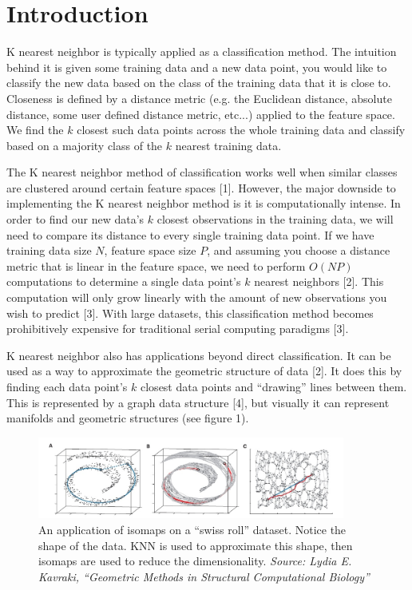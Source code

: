 \section{Introduction}

\vspace{5 mm}
\noindent
K nearest neighbor is typically applied as a classification method. The 
intuition behind it is given some training data and a new data point, you would 
like to classify the new data based on the class of the training data that it 
is close to. Closeness is defined by a distance metric (e.g. the Euclidean 
distance, absolute distance, some user defined distance metric, etc...) applied 
to the feature space. We find the $k$ closest such data points across the whole 
training data and classify based on a majority class of the $k$ nearest 
training data.

\vspace{5 mm}
\noindent
The K nearest neighbor method of classification works well when similar classes 
are clustered around certain feature spaces [1]. However, the major downside to 
implementing the K nearest neighbor method is it is computationally intense. 
In order to find our new data's $k$ closest observations in the training data, 
we will need to compare its distance to every single training data point. 
If we have training data size $N$, feature space size $P$, and assuming you 
choose a distance metric that is linear in the feature space, we need to 
perform $O(NP)$ computations to determine a single data point's $k$ nearest 
neighbors [2]. This computation will only grow linearly with the amount of new 
observations you wish to predict [3]. With large datasets, this classification 
method becomes prohibitively expensive for traditional serial computing 
paradigms [3].


\vspace{5 mm}
\noindent
K nearest neighbor also has applications beyond direct classification. It can 
be used as a way to approximate the geometric structure of data [2]. It does 
this by finding each data point's $k$ closest data points and ``drawing'' lines 
between them. This is represented by a graph data structure [4], but visually it 
can represent manifolds and geometric structures (see figure 1).

\hrulefill
\begin{figure}[h]
\centering
\includegraphics[width=0.9\textwidth]{manifold}
\caption{An application of isomaps on a ``swiss roll'' dataset. Notice
the shape of the data. KNN is used to approximate this shape, then isomaps are used 
to reduce the dimensionality. \textit{Source: Lydia E. Kavraki, ``Geometric Methods 
in Structural Computational Biology''}}
\end{figure}
\hrulefill

